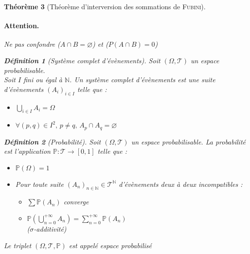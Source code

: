 \documentclass[11pt,a4paper]{report}
\newtheorem{theorem}{Théorème}[chapter]
\theoremstyle{definition}
\newtheorem{dfn}[theorem]{Définition}
\begin{document}
\begin{theorem}[Théorème d'interversion des sommations de \textsc{Fubini}]
{{\paragraph{Attention.} Ne pas confondre ($A \cap B = \varnothing$) et ($P(A\cap B) = 0$)
\begin{dfn}[Système complet d'évènements]
     Soit $(\Omega, \mathscr{T})$ un espace probabilisable.\\
     Soit $I$ fini ou égal à $\mathbb{N}$.\newline
     Un \emph{système complet d'évènements} est \emph{une suite d'évènements} $(A_i)_{i\in I}$ telle que :
     \begin{itemize}
         \item $\bigcup_{i\in I} A_i = \Omega$
         \item $\forall (p,q) \in I^2,\, p\neq q,\, A_p \cap A_q = \varnothing$
     \end{itemize}
\end{dfn}
\begin{dfn}[Probabilité]\label{dfn:probabilite}
     Soit $(\Omega, \mathscr{T})$ un espace probabilisable. La \emph{probabilité} est l'application $\mathbb{P} : \mathscr{T} \to [0,1]$ telle que :
     \begin{itemize}
         \item $\mathbb{P}(\Omega) = 1$
         \item Pour toute suite $(A_n)_{n\in\mathbb{N}} \in \mathscr{T}^\mathbb{N}$ d'évènements \emph{deux à deux incompatibles} : 
         \begin{itemize}
             \item $\sum \mathbb{P}(A_n)$ converge
             \item $\mathbb{P}\left( \bigcup_{n=0}^{+\infty} A_n \right) = \sum_{n=0}^{+\infty} \mathbb{P}(A_n)$\\
             ($\sigma$-additivité)
         \end{itemize}
     \end{itemize}
     Le triplet $(\Omega, \mathscr{T},\mathbb{P})$ est appelé \emph{espace probabilisé}
\end{dfn}
}}
\end{theorem}
\end{document}
